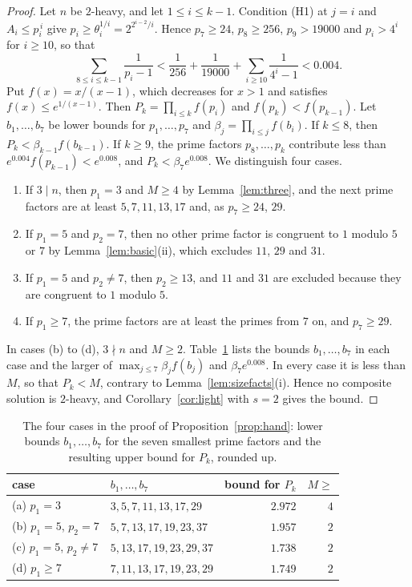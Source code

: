 \documentclass[11pt,reqno]{amsart}
\numberwithin{equation}{section}
\theoremstyle{plain}
\theoremstyle{definition}
\theoremstyle{remark}
\begin{document}
\begin{proof}
Let $n$ be $2$-heavy, and let $1\le i\le k-1$. Condition (H1) at $j=i$
and $A_i\le p_i^{\,i}$ give $p_i\ge\theta_i^{1/i}=2^{2^{i-2}/i}$. Hence
$p_7\ge24$, $p_8\ge256$, $p_9>19000$ and $p_i>4^i$ for $i\ge10$, so
that
\[
  \sum_{8\le i\le k-1}\frac1{p_i-1}<\frac1{256}+\frac1{19000}
  +\sum_{i\ge10}\frac1{4^i-1}<0.004 .
\]
Put $f(x)=x/(x-1)$, which decreases for $x>1$ and satisfies
$f(x)\le e^{1/(x-1)}$. Then $P_k=\prod_{i\le k}f(p_i)$ and
$f(p_k)<f(p_{k-1})$. Let $b_1,\dots,b_7$ be lower bounds for
$p_1,\dots,p_7$ and $\beta_j=\prod_{i\le j}f(b_i)$. If $k\le8$, then
$P_k<\beta_{k-1}f(b_{k-1})$. If $k\ge9$, the prime factors
$p_8,\dots,p_k$ contribute less than $e^{0.004}f(p_{k-1})<e^{0.008}$,
and $P_k<\beta_7e^{0.008}$. We distinguish four cases.
\begin{enumerate}[label=(\alph*)]
\item If $3\mid n$, then $p_1=3$ and $M\ge4$ by Lemma~\ref{lem:three},
  and the next prime factors are at least $5,7,11,13,17$ and, as
  $p_7\ge24$, $29$.
\item If $p_1=5$ and $p_2=7$, then no other prime factor is congruent
  to $1$ modulo $5$ or $7$ by Lemma~\ref{lem:basic}(ii), which excludes
  $11$, $29$ and $31$.
\item If $p_1=5$ and $p_2\ne7$, then $p_2\ge13$, and $11$ and $31$ are
  excluded because they are congruent to $1$ modulo $5$.
\item If $p_1\ge7$, the prime factors are at least the primes from $7$
  on, and $p_7\ge29$.
\end{enumerate}
In cases (b) to (d), $3\nmid n$ and $M\ge2$. Table~\ref{tab:hand}
lists the bounds $b_1,\dots,b_7$ in each case and the larger of
$\max_{j\le7}\beta_jf(b_j)$ and $\beta_7e^{0.008}$. In every case it is
less than $M$, so that $P_k<M$, contrary to
Lemma~\ref{lem:sizefacts}(i). Hence no composite solution is
$2$-heavy, and Corollary~\ref{cor:light} with $s=2$ gives the bound.
\end{proof}

\begin{table}[ht]
\centering
\caption{The four cases in the proof of Proposition~\ref{prop:hand}:
lower bounds $b_1,\dots,b_7$ for the seven smallest prime factors and
the resulting upper bound for $P_k$, rounded up.}
\label{tab:hand}
\smallskip
\small
\begin{tabular}{@{}llrr@{}}
\toprule
case & $b_1,\dots,b_7$ & bound for $P_k$ & $M\ge$ \\
\midrule
(a) $p_1=3$ & $3,5,7,11,13,17,29$ & $2.972$ & $4$ \\
(b) $p_1=5$, $p_2=7$ & $5,7,13,17,19,23,37$ & $1.957$ & $2$ \\
(c) $p_1=5$, $p_2\ne7$ & $5,13,17,19,23,29,37$ & $1.738$ & $2$ \\
(d) $p_1\ge7$ & $7,11,13,17,19,23,29$ & $1.749$ & $2$ \\
\bottomrule
\end{tabular}
\end{table}
\end{document}
